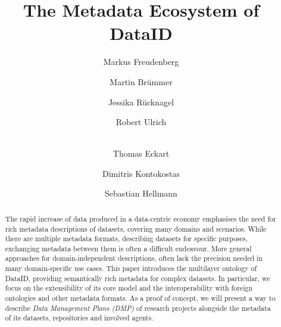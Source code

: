 \documentclass[runningheads,a4paper]{llncs}
\begin{document}
\title{The Metadata Ecosystem of DataID}



\author{
Markus Freudenberg \and
Martin Brümmer \and
Jessika Rücknagel \and
Robert Ulrich \and\\
Thomas Eckart \and
Dimitris Kontokostas \and
Sebastian Hellmann}



\maketitle

\begin{abstract}
The rapid increase of data produced in a data-centric economy emphasises the need for rich metadata descriptions of datasets, covering many domains and scenarios. While there are multiple metadata formats, describing datasets for specific purposes, exchanging metadata between them is often a difficult endeavour. More general approaches for domain-independent descriptions, often lack the precision needed in many domain-specific use cases.
This paper introduces the multilayer ontology of DataID, providing semantically rich metadata for complex datasets. In particular, we focus on the extensibility of its core model and the interoperability with foreign ontologies and other metadata formats.
As a proof of concept, we will present a way to describe \emph{Data Management Plans (DMP)} of research projects alongside the metadata of its datasets, repositories and involved agents.

\end{abstract}
\end{document}
